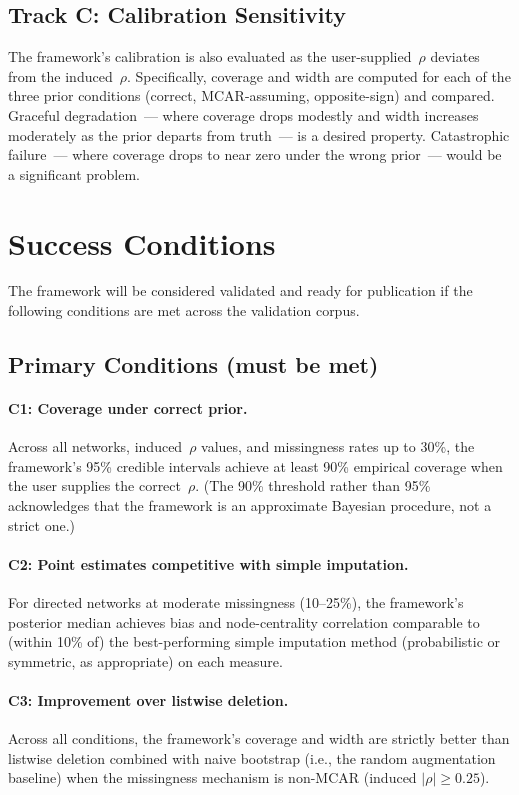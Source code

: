 \documentclass[11pt]{article}
\begin{document}
\subsection{Track C: Calibration Sensitivity}

The framework's calibration is also evaluated as the user-supplied~$\rho$ deviates from the induced~$\rho$. Specifically, coverage and width are computed for each of the three prior conditions (correct, MCAR-assuming, opposite-sign) and compared. Graceful degradation~--- where coverage drops modestly and width increases moderately as the prior departs from truth~--- is a desired property. Catastrophic failure~--- where coverage drops to near zero under the wrong prior~--- would be a significant problem.

\section{Success Conditions}

The framework will be considered validated and ready for publication if the following conditions are met across the validation corpus.

\subsection{Primary Conditions (must be met)}

\paragraph{C1: Coverage under correct prior.} Across all networks, induced~$\rho$ values, and missingness rates up to 30\%, the framework's 95\% credible intervals achieve at least 90\% empirical coverage when the user supplies the correct~$\rho$. (The 90\% threshold rather than 95\% acknowledges that the framework is an approximate Bayesian procedure, not a strict one.)

\paragraph{C2: Point estimates competitive with simple imputation.} For directed networks at moderate missingness (10--25\%), the framework's posterior median achieves bias and node-centrality correlation comparable to (within 10\% of) the best-performing simple imputation method (probabilistic or symmetric, as appropriate) on each measure.

\paragraph{C3: Improvement over listwise deletion.} Across all conditions, the framework's coverage and width are strictly better than listwise deletion combined with naive bootstrap (i.e., the random augmentation baseline) when the missingness mechanism is non-MCAR (induced $|\rho| \geq 0.25$).
\end{document}
